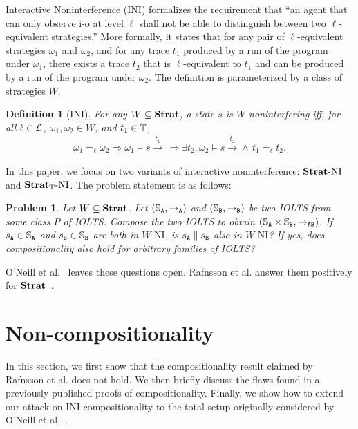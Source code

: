 \documentclass[preprint,5p,twocolumn]{elsarticle}
\newtheorem{definition}[theorem]{Definition}
\newtheorem{problem}[theorem]{Problem}
\begin{document}
Interactive Noninterference (INI) formalizes the requirement that ``an agent that can only observe
i-o at level $\ell$ shall not be able to distinguish between two $\ell$-equivalent strategies.''
More formally, it states that for any pair of $\ell$-equivalent strategies $\omega_1$
and $\omega_2$, and for any trace $t_1$ produced by a run of the program under $\omega_1$,
there exists a trace $t_2$ that is $\ell$-equivalent to $t_1$ and can be produced by a run of the
program under $\omega_2$. The definition is parameterized by a class of strategies $W$.

\begin{definition}[INI]
  For any $W \subseteq \mathbf{Strat}$, a state $s$ is $W$-noninterfering iff, for all $\ell \in \mathcal{L}$, $\omega_1,\omega_2 \in W$, and $t_1 \in \mathbb{T}$,
  \begin{align*}
\omega_1 =_\ell \omega_2 \Longrightarrow \omega_1 \models s \xrightarrow{t_1}\,\Longrightarrow \exists t_2.\,\omega_2 \models s \xrightarrow{t_2} \land\, t_1 =_\ell t_2.
  \end{align*}
\end{definition}

In this paper, we focus on two variants of interactive noninterference: $\mathbf{Strat}\text{-}\mathrm{NI}$ and $\mathbf{Strat}_{\mathrm{T}}\text{-}\mathrm{NI}$. The problem statement is as follows:
\begin{problem}
  Let $W \subseteq \mathbf{Strat}$. Let $(\mathbb{S}_{\mathtt{A}}, \rightarrow_{\mathtt{A}})$ and $(\mathbb{S}_{\mathtt{B}}, \rightarrow_{\mathtt{B}})$ be two IOLTS from some class $P$ of IOLTS. Compose the two IOLTS to obtain $(\mathbb{S}_{\mathtt{A}} \times \mathbb{S}_{\mathtt{B}}, \rightarrow_{\mathtt{AB}})$. If $s_{\mathtt{A}} \in \mathbb{S}_{\mathtt{A}}$ and $s_{\mathtt{B}} \in \mathbb{S}_{\mathtt{B}}$ are both in $W\text{-NI}$, is $s_{\mathtt{A}} \parallel s_{\mathtt{B}}$ also in $W\text{-NI}$? If yes, does compositionality also hold for arbitrary families of IOLTS?
\end{problem}

O'Neill et al.~\cite{ONeill2006} leaves these questions open. Rafnsson et al. answer them positively for $\mathbf{Strat}$~\cite[Theorem V.1]{Rafnsson2012}.

\section{Non-compositionality}

\label{sec:non-compositionality}

In this section, we first show that the compositionality result claimed by Rafnsson et al.
 does not hold. We then briefly discuss the flaws found in a previously published proofs
 of compositionality. Finally, we show how to extend our attack on INI compositionality
 to the total setup originally considered by O'Neill et
al.~\cite{ONeill2006}.
\end{document}

